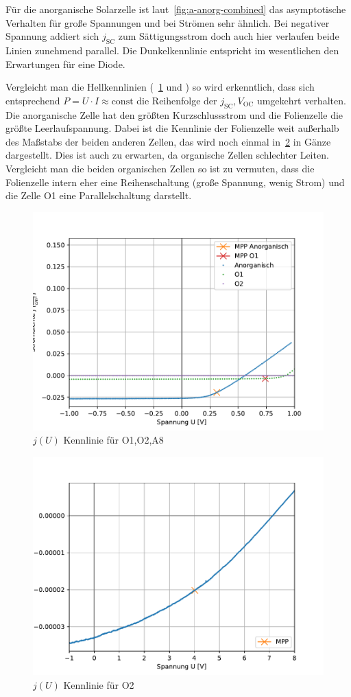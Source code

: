 \documentclass[slug=SZ, room=Hermann-Krone-Bau\,\ Labor\ 1.25, supervisor=Martin\ Kroll]{../../Lab_Report_LaTeX/lab_report}
\newcommand{\voc}{V_{\text{OC}}}
\newcommand{\jsc}{j_{\text{SC}}}
\begin{document}
F\"ur die anorganische Solarzelle ist laut~\ref{fig:a-anorg-combined}
das asymptotische Verhalten f\"ur gro\ss{}e Spannungen und bei
Str\"omen sehr \"ahnlich. Bei negativer Spannung addiert sich
\(\jsc\) zum S\"attigungsstrom doch auch hier verlaufen beide Linien
zunehmend parallel. Die Dunkelkennlinie entspricht im wesentlichen
den Erwartungen f\"ur eine Diode.

Vergleicht man die Hellkennlinien (~\ref{fig:a-all-combined} und ) so wird
erkenntlich, dass sich entsprechend
\(P=U\cdot I \approx \text{const}\) die Reihenfolge der \(\jsc, \voc\)
umgekehrt verhalten. Die anorganische Zelle hat den gr\"o\ss{}ten
Kurzschlussstrom und die Folienzelle die gr\"o\ss{}te
Leerlaufspannung. Dabei ist die Kennlinie der Folienzelle weit
außerhalb des Ma\ss{}stabs der beiden anderen Zellen, das wird
noch einmal in~\ref{fig:a-fol-light} in G\"anze dargestellt.
Dies ist auch zu erwarten, da organische Zellen
schlechter Leiten. Vergleicht man die beiden organischen
Zellen so ist zu vermuten, dass die Folienzelle intern eher eine
Reihenschaltung (große Spannung, wenig Strom) und die Zelle
O1 eine Parallelschaltung darstellt.


\begin{figure}[H]\centering
  \includegraphics[width=.7\columnwidth]{./figs/python/A/all_combined.pdf}
  \caption{\(j(U)\) Kennlinie f\"ur O1,O2,A8}
  \label{fig:a-all-combined}
\end{figure}
\begin{figure}[H]\centering
  \includegraphics[width=.7\columnwidth]{./figs/python/A/fol_hell.pdf}
  \caption{\(j(U)\) Kennlinie f\"ur O2}
  \label{fig:a-fol-light}
\end{figure}
\end{document}
